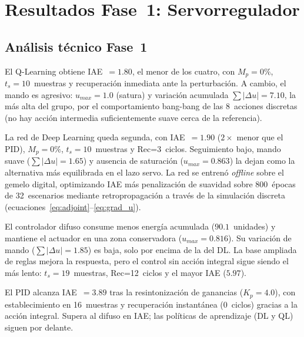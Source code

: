 \section{Resultados Fase~1: Servorregulador}





\subsection*{Análisis técnico Fase~1}

El Q-Learning obtiene IAE~$=1.80$, el menor de los cuatro, con $M_p=0\%$, $t_s=10$~muestras y recuperación inmediata ante la perturbación. A cambio, el mando es agresivo: $u_{max}=1.0$ (satura) y variación acumulada $\sum|\Delta u|=7.10$, la más alta del grupo, por el comportamiento bang-bang de las 8~acciones discretas (no hay acción intermedia suficientemente suave cerca de la referencia).

La red de Deep Learning queda segunda, con IAE~$=1.90$ ($2\times$ menor que el PID), $M_p=0\%$, $t_s=10$~muestras y Rec=3~ciclos. Seguimiento bajo, mando suave ($\sum|\Delta u|=1.65$) y ausencia de saturación ($u_{max}=0.863$) la dejan como la alternativa más equilibrada en el lazo servo. La red se entrenó \emph{offline} sobre el gemelo digital, optimizando IAE más penalización de suavidad sobre 800~épocas de 32~escenarios mediante retropropagación a través de la simulación discreta (ecuaciones~\ref{eq:adjoint}--\ref{eq:grad_u}).

El controlador difuso consume menos energía acumulada ($90.1$~unidades) y mantiene el actuador en una zona conservadora ($u_{max}=0.816$). Su variación de mando ($\sum|\Delta u|=1.85$) es baja, solo por encima de la del DL. La base ampliada de reglas mejora la respuesta, pero el control sin acción integral sigue siendo el más lento: $t_s=19$~muestras, Rec=12~ciclos y el mayor IAE ($5.97$).

El PID alcanza IAE~$=3.89$ tras la resintonización de ganancias ($K_p=4.0$), con establecimiento en 16~muestras y recuperación instantánea ($0$~ciclos) gracias a la acción integral. Supera al difuso en IAE; las políticas de aprendizaje (DL y QL) siguen por delante.

